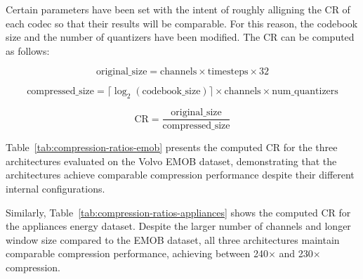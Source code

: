 Certain parameters have been set with the intent of roughly alligning the CR of each codec so that their results will be comparable. For this reason, the codebook size and the number of quantizers have been modified. The CR can be computed as follows:

\begin{equation}
\text{original\_size} = \text{channels} \times \text{timesteps} \times 32
\end{equation}

\begin{equation}
\text{compressed\_size} = \lceil \log_2(\text{codebook\_size}) \rceil \times \text{channels} \times \text{num\_quantizers}
\end{equation}

\begin{equation}
\text{CR} = \frac{\text{original\_size}}{\text{compressed\_size}}
\end{equation}

Table~\ref{tab:compression-ratios-emob} presents the computed CR for the three architectures evaluated on the Volvo EMOB dataset, demonstrating that the architectures achieve comparable compression performance despite their different internal configurations.

\begin{table}[h]
\small
\centering
\caption{Compression Ratio Comparison for EMOB Dataset (3 channels, 128 timesteps)}
\label{tab:compression-ratios-emob}
\end{table}

Similarly, Table~\ref{tab:compression-ratios-appliances} shows the computed CR for the appliances energy dataset. Despite the larger number of channels and longer window size compared to the EMOB dataset, all three architectures maintain comparable compression performance, achieving between 240$\times$ and 230$\times$ compression.

